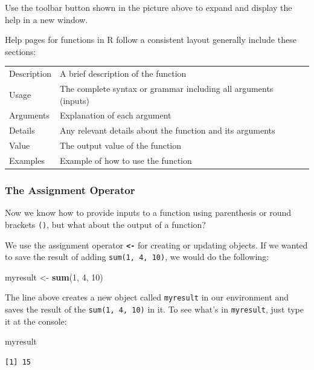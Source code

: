 \documentclass[]{article}
\newenvironment{Shaded}{\begin{snugshade}}{\end{snugshade}}
\newcommand{\DecValTok}[1]{\textcolor[rgb]{0.00,0.00,0.81}{#1}}
\newcommand{\KeywordTok}[1]{\textcolor[rgb]{0.13,0.29,0.53}{\textbf{#1}}}
\newcommand{\NormalTok}[1]{#1}
\newcommand{\StringTok}[1]{\textcolor[rgb]{0.31,0.60,0.02}{#1}}
\begin{document}
Use the toolbar button shown in the picture above to expand and display the help in a new window.

Help pages for functions in R follow a consistent layout generally include these sections:

\begin{longtable}[]{@{}ll@{}}
\toprule
\endhead
Description & A brief description of the function\tabularnewline
Usage & The complete syntax or grammar including all arguments (inputs)\tabularnewline
Arguments & Explanation of each argument\tabularnewline
Details & Any relevant details about the function and its arguments\tabularnewline
Value & The output value of the function\tabularnewline
Examples & Example of how to use the function\tabularnewline
\bottomrule
\end{longtable}

\hypertarget{the-assignment-operator}{%
\subsubsection{The Assignment Operator}\label{the-assignment-operator}}

Now we know how to provide inputs to a function using parenthesis or round brackets \texttt{()}, but what about the output of a function?

We use the assignment operator \textbf{\texttt{\textless{}-}} for creating or updating objects. If we wanted to save the result of adding \texttt{sum(1,\ 4,\ 10)}, we would do the following:

\begin{Shaded}
\begin{Highlighting}[]
\NormalTok{myresult <-}\StringTok{ }\KeywordTok{sum}\NormalTok{(}\DecValTok{1}\NormalTok{, }\DecValTok{4}\NormalTok{, }\DecValTok{10}\NormalTok{)}
\end{Highlighting}
\end{Shaded}

The line above creates a new object called \texttt{myresult} in our environment and saves the result of the \texttt{sum(1,\ 4,\ 10)} in it. To see what's in \texttt{myresult}, just type it at the console:

\begin{Shaded}
\begin{Highlighting}[]
\NormalTok{myresult}
\end{Highlighting}
\end{Shaded}

\begin{verbatim}
[1] 15
\end{verbatim}
\end{document}
